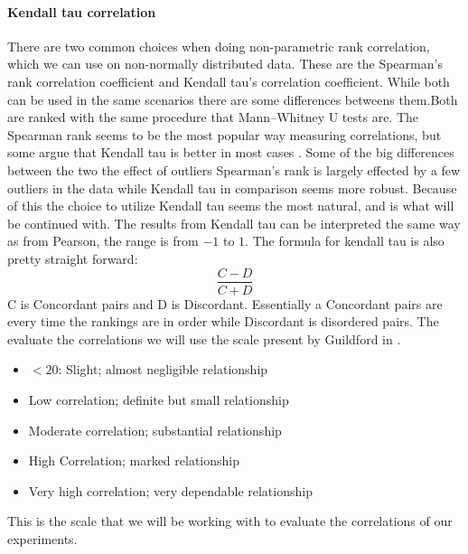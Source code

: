\paragraph{Kendall tau correlation}
There are two common choices when doing non-parametric rank correlation, which we can use on non-normally distributed data. These are the Spearman's rank correlation coefficient and Kendall tau's correlation coefficient. While both can be used in the same scenarios there are some differences betweens them.Both are ranked with the same procedure that Mann–Whitney U tests are. The Spearman rank seems to be the most popular way measuring correlations, but some argue that Kendall tau is better in most cases \cite{gilpin1993table}. Some of the big differences between the two the effect of outliers Spearman's rank is largely effected by a few outliers in the data while Kendall tau in comparison seems more robust. Because of this the choice to utilize Kendall tau seems the most natural, and is what will be continued with. The results from Kendall tau can be interpreted the same way as from Pearson, the range is from $-1$ to $1$. The formula for kendall tau is also pretty straight forward:
$$\frac{C-D}{C+D}$$
C is Concordant pairs and D is Discordant. Essentially a Concordant pairs are every time the rankings are in order while Discordant is disordered pairs\cite{kendall1938new}. The evaluate the correlations we will use the scale present by Guildford in \cite[219]{guilford1950fundamental}.
\begin{itemize}
    \item $<20$: Slight; almost negligible relationship
    \item Low correlation; definite but small relationship
    \item Moderate correlation; substantial relationship
    \item High Correlation; marked relationship
    \item Very high correlation; very dependable relationship
\end{itemize}
This is the scale that we will be working with to evaluate the correlations of our experiments.

